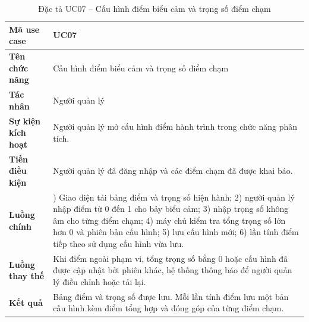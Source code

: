 \documentclass[../LuanVan.tex]{subfiles}
\begin{document}
\begin{table}[H]
    \centering
    \caption{Đặc tả UC07 -- Cấu hình điểm biểu cảm và trọng số điểm chạm}
    \label{tab:uc07_journey_scoring_ch4}
    \begin{tabular}{|>{\raggedright\arraybackslash}p{3.0cm}|>{\raggedright\arraybackslash}p{10.9cm}|}
        \hline
        \textbf{Mã use case} & UC07 \\
        \hline
        \textbf{Tên chức năng} & Cấu hình điểm biểu cảm và trọng số điểm chạm \\
        \hline
        \textbf{Tác nhân} & Người quản lý \\
        \hline
        \textbf{Sự kiện kích hoạt} & Người quản lý mở cấu hình điểm hành trình trong chức năng phân tích. \\
        \hline
        \textbf{Tiền điều kiện} & Người quản lý đã đăng nhập và các điểm chạm đã được khai báo. \\
        \hline
        \textbf{Luồng chính} & 1) Giao diện tải bảng điểm và trọng số hiện hành; 2) người quản lý nhập điểm từ 0 đến 1 cho bảy biểu cảm; 3) nhập trọng số không âm cho từng điểm chạm; 4) máy chủ kiểm tra tổng trọng số lớn hơn 0 và phiên bản cấu hình; 5) lưu cấu hình mới; 6) lần tính điểm tiếp theo sử dụng cấu hình vừa lưu. \\
        \hline
        \textbf{Luồng thay thế} & Khi điểm ngoài phạm vi, tổng trọng số bằng 0 hoặc cấu hình đã được cập nhật bởi phiên khác, hệ thống thông báo để người quản lý điều chỉnh hoặc tải lại. \\
        \hline
        \textbf{Kết quả} & Bảng điểm và trọng số được lưu. Mỗi lần tính điểm lưu một bản cấu hình kèm điểm tổng hợp và đóng góp của từng điểm chạm. \\
        \hline
    \end{tabular}
\end{table}
\end{document}
